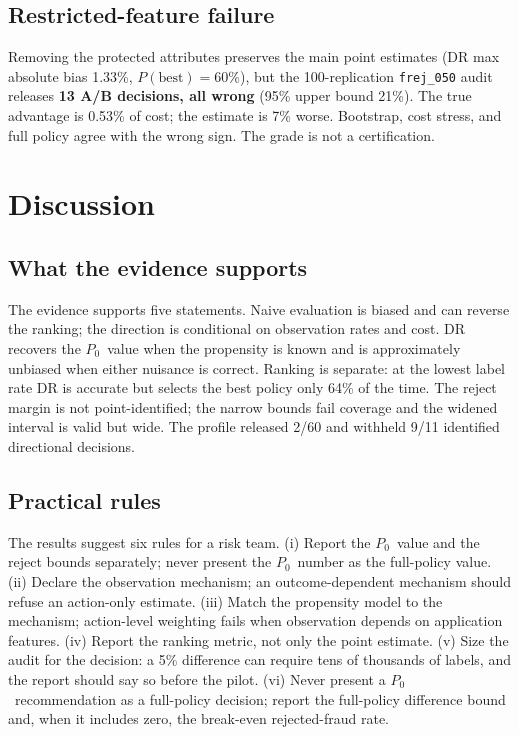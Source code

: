 \documentclass[conference]{IEEEtran}
\newcommand{\Pzero}{\ensuremath{P_0}}
\begin{document}
\subsection{Restricted-feature failure}
Removing the protected attributes preserves the main point estimates (DR max absolute bias 1.33\%, $P(\text{best})=60\%$), but the 100-replication \texttt{frej\_050} audit releases \textbf{13 A/B decisions, all wrong} (95\% upper bound 21\%). The true advantage is 0.53\% of cost; the estimate is 7\% worse. Bootstrap, cost stress, and full policy agree with the wrong sign. The grade is not a certification.

\section{Discussion}

\subsection{What the evidence supports}
The evidence supports five statements. Naive evaluation is biased and can reverse the ranking; the direction is conditional on observation rates and cost. DR recovers the \Pzero\ value when the propensity is known and is approximately unbiased when either nuisance is correct. Ranking is separate: at the lowest label rate DR is accurate but selects the best policy only 64\% of the time. The reject margin is not point-identified; the narrow bounds fail coverage and the widened interval is valid but wide. The profile released 2/60 and withheld 9/11 identified directional decisions.

\subsection{Practical rules}
The results suggest six rules for a risk team. (i) Report the \Pzero\ value and the reject bounds separately; never present the \Pzero\ number as the full-policy value. (ii) Declare the observation mechanism; an outcome-dependent mechanism should refuse an action-only estimate. (iii) Match the propensity model to the mechanism; action-level weighting fails when observation depends on application features. (iv) Report the ranking metric, not only the point estimate. (v) Size the audit for the decision: a 5\% difference can require tens of thousands of labels, and the report should say so before the pilot. (vi) Never present a \Pzero\ recommendation as a full-policy decision; report the full-policy difference bound and, when it includes zero, the break-even rejected-fraud rate.
\end{document}

